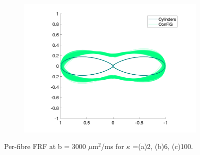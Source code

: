 \begin{figure}
\begin{subfigure}[]{0.32\textwidth}
    \includegraphics[width=\textwidth]{figures/frf_experiment/kappa_100_b_3000.png}
    \caption{}
  \end{subfigure}

  \caption{Per-fibre FRF at b = 3000 $\mu$m$^2$/ms for $\kappa$ =(a)2, (b)6, (c)100.}
  \label{fig:frf_per_fibre_b3000}
\end{figure}


